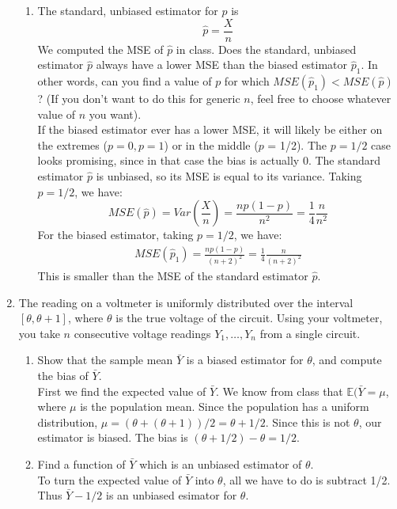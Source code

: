 \documentclass[12pt]{article}
\def\E{{\mathbb E}}
\begin{document}
\begin{enumerate}
\begin{enumerate}
\item The standard, unbiased estimator for $p$ is 
\[
\hat{p} = \frac{X}{n}
\]
We computed the MSE of $\hat{p}$ in class. Does the standard, unbiased estimator $\hat{p}$ always have a lower MSE than the biased estimator $\hat{p}_1$. In other words, can you find a value of $p$ for which $MSE(\hat{p}_1) < MSE(\hat{p})$? (If you don't want to do this for generic $n$, feel free to choose whatever value of $n$ you want).\\

If the biased estimator ever has a lower MSE, it will likely be either on the extremes ($p = 0, p = 1$) or in the middle ($p$ = 1/2). The $p = 1/2$ case looks promising, since in that case the bias is actually 0. The standard estimator $\hat{p}$ is unbiased, so its MSE is equal to its variance. Taking $p = 1/2$, we have:
\[
MSE(\hat{p}) = Var\left(\frac{X}{n}\right) = \frac{np(1-p)}{n^2} = \frac{1}{4}\frac{n}{n^2}
\] 
For the biased estimator, taking $p = 1/2$, we have:
\begin{align*}
MSE(\hat{p}_1) = \frac{np(1-p)}{(n+2)^2} = \frac{1}{4}\frac{n}{(n+2)^2}
\end{align*}
This is smaller than the MSE of the standard estimator $\hat{p}$.
\end{enumerate}

\item The reading on a voltmeter is uniformly distributed over the interval $[\theta, \theta+1]$, where $\theta$ is the true voltage of the circuit. Using your voltmeter, you take $n$ consecutive voltage readings $Y_1, \dots, Y_n$ from a single circuit.
\begin{enumerate}
\item Show that the sample mean $\bar{Y}$ is a biased estimator for $\theta$, and compute the bias of $\bar{Y}$.\\

First we find the expected value of $\bar{Y}$. We know from class that $\E(\bar{Y} = \mu$, where $\mu$ is the population mean. Since the population has a uniform distribution, $\mu = (\theta + (\theta + 1)) / 2 = \theta + 1/2$. Since this is not $\theta$, our estimator is biased. The bias is $(\theta + 1/2) - \theta = 1/2$.

\item Find a function of $\bar{Y}$ which is an unbiased estimator of $\theta$.\\

To turn the expected value of $\bar{Y}$ into $\theta$, all we have to do is subtract 1/2. Thus $\bar{Y} - 1/2$ is an unbiased esimator for $\theta$.


\end{enumerate}
\end{enumerate}
\end{document}
